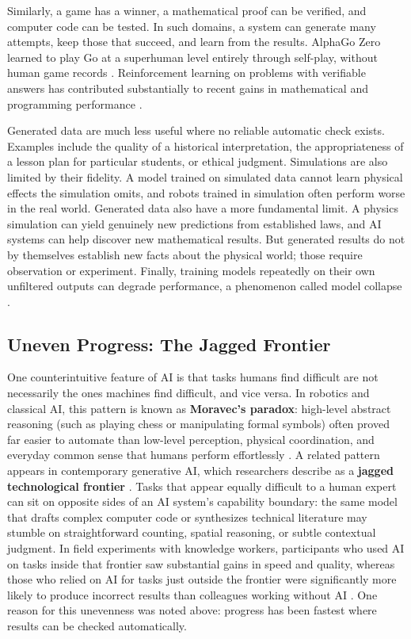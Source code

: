 \documentclass[11pt]{article}
\begin{document}
Similarly, a game has a winner, a mathematical proof can be verified, and computer code can be tested. In such domains, a system can generate many attempts, keep those that succeed, and learn from the results. AlphaGo Zero learned to play Go at a superhuman level entirely through self-play, without human game records \citep{Silver2017AlphaGoZero}. Reinforcement learning on problems with verifiable answers has contributed substantially to recent gains in mathematical and programming performance \citep{Guo2025DeepSeekR1}.

Generated data are much less useful where no reliable automatic check exists. Examples include the quality of a historical interpretation, the appropriateness of a lesson plan for particular students, or ethical judgment. Simulations are also limited by their fidelity. A model trained on simulated data cannot learn physical effects the simulation omits, and robots trained in simulation often perform worse in the real world. Generated data also have a more fundamental limit. A physics simulation can yield genuinely new predictions from established laws, and AI systems can help discover new mathematical results. But generated results do not by themselves establish new facts about the physical world; those require observation or experiment. Finally, training models repeatedly on their own unfiltered outputs can degrade performance, a phenomenon called model collapse \citep{Shumailov2024Collapse}.

\subsection{Uneven Progress: The Jagged Frontier}

One counterintuitive feature of AI is that tasks humans find difficult are not necessarily the ones machines find difficult, and vice versa. In robotics and classical AI, this pattern is known as \textbf{Moravec's paradox}: high-level abstract reasoning (such as playing chess or manipulating formal symbols) often proved far easier to automate than low-level perception, physical coordination, and everyday common sense that humans perform effortlessly \citep{Moravec1988MindChildren}. A related pattern appears in contemporary generative AI, which researchers describe as a \textbf{jagged technological frontier} \citep{DellAcqua2026JaggedFrontier}. Tasks that appear equally difficult to a human expert can sit on opposite sides of an AI system's capability boundary: the same model that drafts complex computer code or synthesizes technical literature may stumble on straightforward counting, spatial reasoning, or subtle contextual judgment. In field experiments with knowledge workers, participants who used AI on tasks inside that frontier saw substantial gains in speed and quality, whereas those who relied on AI for tasks just outside the frontier were significantly more likely to produce incorrect results than colleagues working without AI \citep{DellAcqua2026JaggedFrontier}.
One reason for this unevenness was noted above: progress has been fastest where results can be checked automatically.
\end{document}
